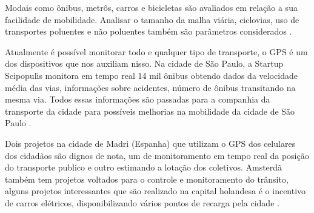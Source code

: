 Modais como ônibus, metrôs, carros e bicicletas são avaliados em relação a sua facilidade de mobilidade. Analisar o tamanho da malha viária, ciclovias, uso de transportes poluentes e não poluentes também são parâmetros considerados \cite{kon}. 


Atualmente é possível monitorar todo e qualquer tipo de transporte, o GPS é um dos dispositivos que nos auxiliam nisso. Na cidade de São Paulo, a Startup Scipopulis monitora em tempo real 14 mil ônibus obtendo dados da velocidade média das vias, informações sobre acidentes, número de ônibus transitando na mesma via. Todos essas informações são passadas para a companhia da transporte da cidade para possíveis melhorias na mobilidade da cidade de São Paulo \cite{kon}.

Dois projetos na cidade de Madri (Espanha) que utilizam o GPS dos celulares dos cidadãos são dignos de nota, um de monitoramento em tempo real da posição do transporte publico e outro estimando a lotação dos coletivos. Amsterdã também tem projetos voltados para o controle e monitoramento do trânsito, alguns projetos interessantes que são realizado na capital holandesa é o incentivo de carros elétricos, disponibilizando vários pontos de recarga pela cidade \cite{kon}.









